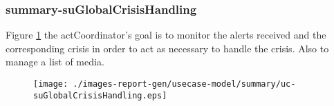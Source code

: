 \subsubsection{summary-suGlobalCrisisHandling}

\label{RE-use-case-suGlobalCrisisHandling}



Figure \ref{fig:lu.uni.lassy.excalibur.icrash-spec-RE-UCD-uc-suGlobalCrisisHandling}
the actCoordinator's goal is to monitor the alerts received and the corresponding crisis in order to act as necessary to handle the crisis. Also to manage a list of media.

\begin{figure}[htbp]
\begin{center}

\texttt{[image: ./images-report-gen/usecase-model/summary/uc-suGlobalCrisisHandling.eps]}
\end{center}
\caption[lu.uni.lassy.excalibur.icrash-spec Use Case Diagram: uc-suGlobalCrisisHandling]{}
\label{fig:lu.uni.lassy.excalibur.icrash-spec-RE-UCD-uc-suGlobalCrisisHandling}
\end{figure}
\vspace{0.5cm}
